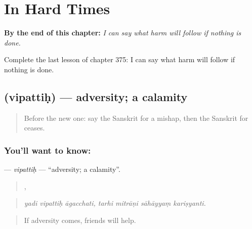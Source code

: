 
\chapter{In Hard Times}
\label{ch:sa-in-hard-times}

\begin{chapteropening}
\textbf{By the end of this chapter:} \emph{I can say what harm will follow if nothing is done.}

Complete the last lesson of chapter 375: I can say what harm will follow if nothing is done.
\end{chapteropening}

\section[\texorpdfstring{\sk{विपत्तिः} (vipattiḥ)}{विपत्तिः (vipattiḥ)}]{ (vipattiḥ) — adversity; a calamity}

\label{lesson:SA-C375-vipattih}



\begin{quote}
Before the new one: say the Sanskrit for a mishap, then the Sanskrit for ceases.
\end{quote}

\subsection*{You'll want to know: }
\textbf{} — \emph{vipattiḥ} — \textquotedblleft{}adversity; a calamity\textquotedblright{}.

\begin{quote}
  ,    
\end{quote}

\begin{quote}
\emph{yadi vipattiḥ āgacchati, tarhi mitrāṇi sāhāyyaṃ kariṣyanti.}
\end{quote}

\begin{quote}
If adversity comes, friends will help.
\end{quote}

